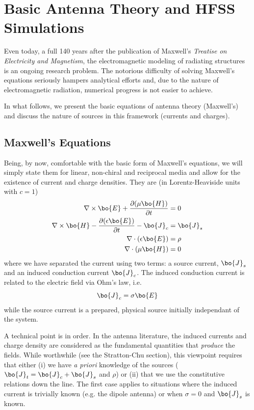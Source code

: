 \section{Basic Antenna Theory and HFSS Simulations}
Even today, a full 140 years after the publication of 
Maxwell's \textit{Treatise on Electricity and Magnetism}, 
the electromagnetic modeling of radiating structures 
is an ongoing research problem. The notorious difficulty 
of solving Maxwell's equations seriously hampers analy\-ti\-cal efforts
and, due to the nature of electromagnetic radiation, numerical
progress is not easier to achieve.

In what follows, we present the basic equations of 
antenna theory (Maxwell's) and discuss the nature 
of sources in this framework (currents and charges). 

\subsection{Maxwell's Equations}
Being, by now, comfortable with the basic form of Maxwell's equations, 
we will simply state them for linear, non-chiral and reciprocal media
and allow for the existence of current and charge densities. 
They are (in Lorentz-Heaviside units with $c=1$) \cite{NOV2012}
  \begin{subequations}
  \begin{align}
   \nabla\times\bo{E}+\frac{\partial(\mu\bo{H})}{\partial t}	&=0	\\
   \nabla\times\bo{H}-\frac{\partial(\epsilon\bo{E})}{\partial t}-\bo{J}_c&=\bo{J}_s\\
   \nabla\cdot(\epsilon\bo{E})					&=\rho	\\
   \nabla\cdot(\mu\bo{H})					&=0
  \end{align}
  \end{subequations}
where we have separated the current using two terms: a source current, $\bo{J}_s$ and
an induced conduction current $\bo{J}_c$. The induced conduction current
is related to the electric field via Ohm's law, i.e.
  \begin{equation}
   \bo{J}_c=\sigma\bo{E}
  \end{equation}
while the source current is a prepared, physical source initially 
independant of the system.

A technical point is in order. In the antenna literature, the induced
currents and charge density are considered as the fundamental quantities 
that \textit{produce} the fields. While worthwhile (see the Stratton-Chu section), 
this viewpoint requires that either (i) we have \textit{a priori} knowledge of 
the sources ($\bo{J}_t=\bo{J}_c+\bo{J}_s$ and $\rho$) or (ii) that we use the
constitutive relations down the line. The first case applies to situations
where the induced current is trivially known (e.g. the dipole antenna) or
when $\sigma=0$ and $\bo{J}_s$ is known.


